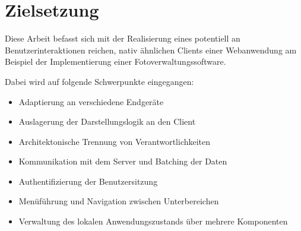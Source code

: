 \newpage

\section{Zielsetzung}
\label{sec:zielsetzung}


Diese Arbeit befasst sich mit der Realisierung eines potentiell an Benutzerinteraktionen reichen, nativ ähnlichen Clients einer Webanwendung am Beispiel der Implementierung einer Fotoverwaltungssoftware.

Dabei wird auf folgende Schwerpunkte eingegangen:
\begin{itemize}
\item Adaptierung an verschiedene Endgeräte
\item Auslagerung der Darstellungslogik an den Client
\item Architektonische Trennung von Verantwortlichkeiten
\item Kommunikation mit dem Server und Batching der Daten
\item Authentifizierung der Benutzersitzung
\item Menüführung und Navigation zwischen Unterbereichen
\item Verwaltung des lokalen Anwendungszustands über mehrere Komponenten
\end{itemize}

\newpage
